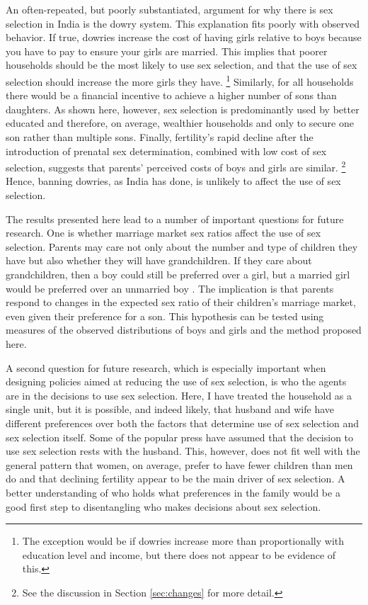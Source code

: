 \documentclass[12pt,letterpaper]{article}
\begin{document}
An often-repeated, but poorly substantiated, argument for why there is sex selection 
in India is the dowry system.
This explanation fits poorly with observed behavior.
If true, dowries increase the cost of having girls relative to boys because you have to 
pay to ensure your girls are married.
This implies that poorer households should be the most likely to use sex selection, and 
that the use of sex selection should increase the more girls they have.%
\footnote{
The exception would be if dowries increase more than proportionally with education level 
and income, but there does not appear to be evidence of this.
} 
Similarly, for all households there would be a financial incentive to achieve a higher 
number of sons than daughters.
As shown here, however, sex selection is predominantly used by better educated and 
therefore, on average, wealthier households and only to secure one son rather than multiple 
sons.
Finally, fertility's rapid decline after the introduction of prenatal sex 
determination, combined with low cost of sex selection, suggests that parents'
perceived costs of boys and girls are similar.%
\footnote{
See the discussion in Section \ref{sec:changes} for more detail.
}
Hence, banning dowries, as India has done, is unlikely to affect the use of sex 
selection. 

The results presented here lead to a number of important questions for future research.
One is whether marriage market sex ratios affect the use of sex selection.
Parents may care not only about the number and type of children they have but 
also whether they will have grandchildren.
If they care about grandchildren, then a boy could still be preferred over a girl, but a 
married girl would be preferred over an unmarried boy \citep{Bhaskar2011}.
The implication is that parents respond to changes in the expected sex ratio of their
children's marriage market, even given their preference for a son.
This hypothesis can be tested using measures of the observed distributions of
boys and girls and the method proposed here.

A second question for future research, which is especially important when designing 
policies aimed at reducing the use of sex selection, is who the agents are in the decisions 
to use sex selection.
Here, I have treated the household as a single unit, but it is possible, and indeed likely, 
that husband and wife have different preferences over both the factors that determine  
use of sex selection and sex selection itself.
Some of the popular press have assumed that the decision to use sex selection rests 
with the husband.
This, however, does not fit well with the general pattern that women, on average, prefer to 
have fewer children than men do and that declining fertility appear to be the main
driver of sex selection.
A better understanding of who holds what preferences in the family would be a good 
first step to disentangling who makes decisions about sex selection.
\end{document}
